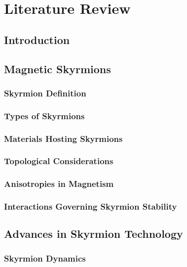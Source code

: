 \chapter{Literature Review}\label{ch:LitRev}
\section{Introduction}\label{sec:LitRevIntro}


\section{Magnetic Skyrmions}\label{sec:MagSkyrmions}

\subsection{Skyrmion Definition}\label{subsec:SkyrDefn}

\subsection{Types of Skyrmions}\label{subsec:TypesSkyrmions}

\subsection{Materials Hosting Skyrmions}\label{subsec:Materials}

\subsection{Topological Considerations}\label{subsec:TopConsiderations}

\subsection{Anisotropies in Magnetism}\label{subsec:Anisotropies}

\subsection{Interactions Governing Skyrmion Stability}\label{subsec:InteractionsGovSkyrmions}

\section{Advances in Skyrmion Technology}\label{sec:AdvancesSkyrmionTech}
\subsection{Skyrmion Dynamics}\label{subsec:Dynamics}

